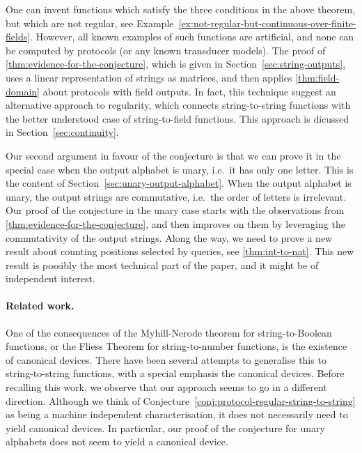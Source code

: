 One can invent functions which satisfy the three conditions in the above theorem, but which are not regular, see Example~\ref{ex:not-regular-but-continuous-over-finite-fields}. However, all known examples of such functions  are artificial, and none can be computed by protocols (or any known transducer models).  The proof of \cref{thm:evidence-for-the-conjecture}, which is given in Section~\ref{sec:string-outputs}, uses a linear representation of strings as matrices, and then applies \cref{thm:field-domain} about protocols with field outputs. In fact, this technique suggest an alternative approach to regularity,  which connects string-to-string functions with the better understood case of string-to-field functions. This approach is dicussed in Section~\ref{sec:continuity}.

Our second argument in favour of  the conjecture is that we can prove it in the special case when the output alphabet is unary, i.e.~it has only one letter. This is the content of Section~\ref{sec:unary-output-alphabet}. When the output alphabet is unary, the output strings are commutative, i.e.~the order of letters is irrelevant. Our proof of the conjecture in the unary case starts with the observations from \cref{thm:evidence-for-the-conjecture}, and then improves on them by leveraging the commutativity of the output strings. Along the way, we need to prove a new result about counting positions selected by \mso queries, see \cref{thm:int-to-nat}. This new result is possibly the most technical part of the paper, and it might be of independent interest.

\paragraph*{Related work.} One of the consequences of the Myhill-Nerode theorem for string-to-Boolean functions, or the Fliess Theorem for string-to-number functions, is the existence of  canonical devices. There have been several attempts to generalise this to string-to-string functions, with a special emphasis the canonical devices. Before recalling this work, we observe that our approach seems to go in a  different direction. Although we think of Conjecture~\ref{conj:protocol-regular-string-to-string} as being a machine independent characterisation, it does not necessarily need to yield canonical devices. In particular, our proof of the conjecture for unary alphabets does not seem to yield a canonical device.

